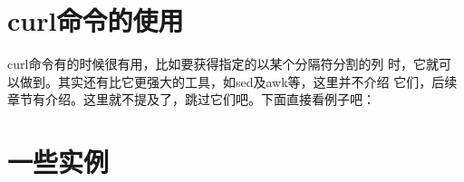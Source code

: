 \section{curl命令的使用}
\label{sec:curlCmd}

curl命令有的时候很有用，比如要获得指定的以某个分隔符分割的列
时，它就可以做到。其实还有比它更强大的工具，如sed及awk等，这里并不介绍
它们，后续章节有介绍。这里就不提及了，跳过它们吧。下面直接看例子吧：

\section{一些实例}
\label{sec:curlExamples}
